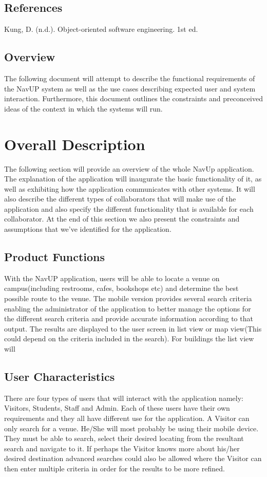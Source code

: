 \documentclass[12pt]{article}
\begin{document}
		
	\subsection{References}
		Kung, D. (n.d.). Object-oriented software engineering. 1st ed.
		
	\subsection{Overview}
		The following document will attempt to describe the functional requirements of the NavUP system as well as the use cases describing expected user and system interaction. Furthermore, this document outlines the constraints and preconceived ideas of the context in which the systems will run.
	\section{Overall Description}	
	The following section will provide an overview of the whole NavUp application. The explanation of the application will inaugurate the basic functionality of it, as well as exhibiting how the application communicates with other systems. It will also describe the different types of collaborators that will make use of the application and also specify the different functionality that is available for each collaborator. At the end of this section we also present the constraints and assumptions that we've identified for the application. 
	\subsection{Product Functions}
	With the NavUP application, users will be able to locate a venue on campus(including restrooms, cafes, bookshops etc) and determine the best possible route to the venue. The mobile version provides several search criteria enabling the administrator of the application to better manage the options for the different search criteria and provide accurate information according to that output. The results are displayed to the user screen in list view or map view(This could depend on the criteria included in the search). For buildings the list view will 
	
	\subsection{User Characteristics}
	There are four types of users that will interact with the application namely: Visitors, Students, Staff and Admin. Each of these users have their own requirements and they all have different use for the application. A Visitor can only search for a venue. He/She will most probably be using their mobile device. They must be able to search, select their desired locating from the resultant search and navigate to it. If perhaps the Visitor knows more about his/her desired destination advanced searches could also be allowed where the Visitor can then enter multiple criteria in order for the results to be more refined.\\
	
\end{document}
